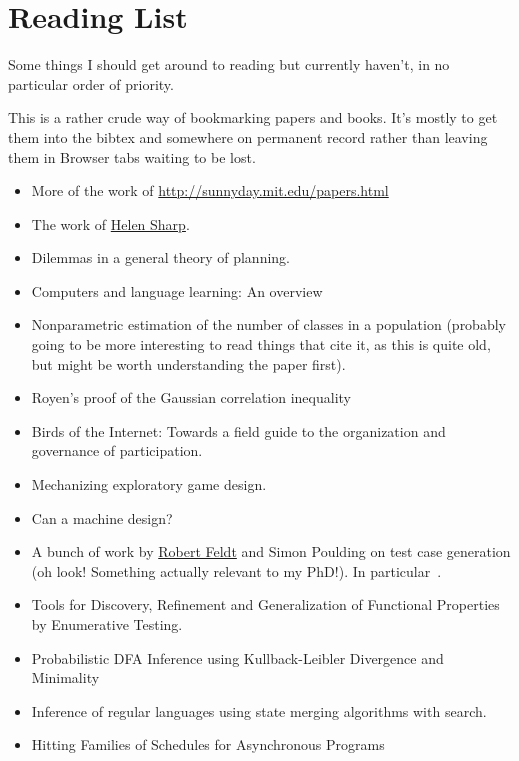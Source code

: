 \documentclass[a4paper]{book}
\begin{document}
\chapter{Reading List}

Some things I should get around to reading but currently haven't,
in no particular order of priority.

This is a rather crude way of bookmarking papers and books.
It's mostly to get them into the bibtex and somewhere on permanent record rather than leaving them in Browser tabs waiting to be lost.


\begin{itemize}
\item More of the work of \href{Nancy Leveson}{http://sunnyday.mit.edu/papers.html}
\item The work of \href{http://mcs.open.ac.uk/hcs2/}{Helen Sharp}.
\item Dilemmas in a general theory of planning\cite{rittel1973dilemmas}.
\item Computers and language learning: An overview\cite{warschauer1998computers}
\item Nonparametric estimation of the number of classes in a population\cite{chao1984nonparametric} (probably going to be more interesting to read things that cite it, as this is quite old, but might be worth understanding the paper first).
\item Royen’s proof of the Gaussian correlation inequality\cite{latala2017royen}
\item Birds of the Internet: Towards a field guide to the organization and governance of participation\cite{fish2011birds}.
\item Mechanizing exploratory game design\cite{smith2012mechanizing}.
\item Can a machine design?\cite{cross2001can}
\item A bunch of work by \href{http://www.robertfeldt.net/}{Robert Feldt} and Simon Poulding on test case generation
(oh look! Something actually relevant to my PhD!).
In particular~\cite{DBLP:conf/icst/PouldingF15, DBLP:conf/issre/FeldtP13, DBLP:conf/icse/FeldtP15}.
\item Tools for Discovery, Refinement and Generalization of Functional Properties by Enumerative Testing\cite{matela2017tools}.
\item Probabilistic DFA Inference using Kullback-Leibler Divergence and Minimality\cite{DBLP:conf/icml/ThollardDH00}
\item Inference of regular languages using state merging algorithms with search\cite{DBLP:journals/pr/BugalhoO05}.
\item Hitting Families of Schedules for Asynchronous Programs\cite{DBLP:conf/cav/ChistikovMN16}
\end{itemize}
\end{document}
